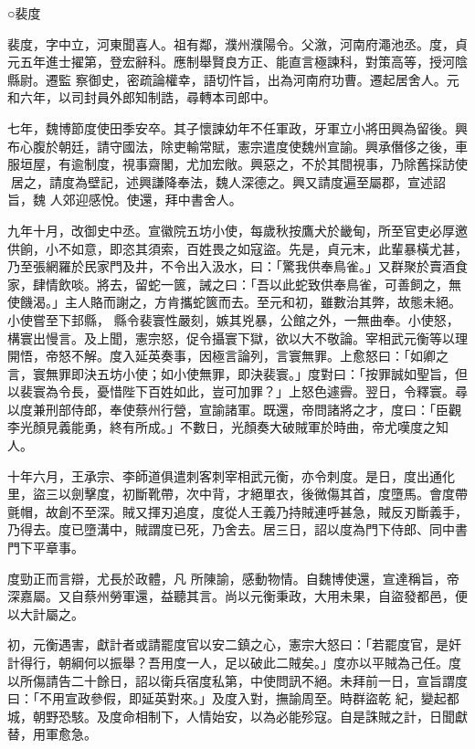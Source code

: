 
\begin{pinyinscope}

 ○裴度



 裴度，字中立，河東聞喜人。祖有鄰，濮州濮陽令。父漵，河南府澠池丞。度，貞元五年進士擢第，登宏辭科。應制舉賢良方正、能直言極諫科，對策高等，授河陰縣尉。遷監
 察御史，密疏論權幸，語切忤旨，出為河南府功曹。遷起居舍人。元和六年，以司封員外郎知制誥，尋轉本司郎中。



 七年，魏博節度使田季安卒。其子懷諫幼年不任軍政，牙軍立小將田興為留後。興布心腹於朝廷，請守國法，除吏輸常賦，憲宗遣度使魏州宣諭。興承僭侈之後，車服垣屋，有逾制度，視事齋閣，尤加宏敞。興惡之，不於其間視事，乃除舊採訪使居之，請度為壁記，述興謙降奉法，魏人深德之。興又請度遍至屬郡，宣述詔旨，魏
 人郊迎感悅。使還，拜中書舍人。



 九年十月，改御史中丞。宣徽院五坊小使，每歲秋按鷹犬於畿甸，所至官吏必厚邀供餉，小不如意，即恣其須索，百姓畏之如寇盜。先是，貞元末，此輩暴橫尤甚，乃至張網羅於民家門及井，不令出入汲水，曰：「驚我供奉鳥雀。」又群聚於賣酒食家，肆情飲啖。將去，留蛇一篋，誡之曰：「吾以此蛇致供奉鳥雀，可善飼之，無使饑渴。」主人賂而謝之，方肯攜蛇篋而去。至元和初，雖數治其弊，故態未絕。小使嘗至下邽縣，
 縣令裴寰性嚴刻，嫉其兇暴，公館之外，一無曲奉。小使怒，構寰出慢言。及上聞，憲宗怒，促令攝寰下獄，欲以大不敬論。宰相武元衡等以理開悟，帝怒不解。度入延英奏事，因極言論列，言寰無罪。上愈怒曰：「如卿之言，寰無罪即決五坊小使；如小使無罪，即決裴寰。」度對曰：「按罪誠如聖旨，但以裴寰為令長，憂惜陛下百姓如此，豈可加罪？」上怒色遽霽。翌日，令釋寰。尋以度兼刑部侍郎，奉使蔡州行營，宣諭諸軍。既還，帝問諸將之才，度曰：「臣觀
 李光顏見義能勇，終有所成。」不數日，光顏奏大破賊軍於時曲，帝尤嘆度之知人。



 十年六月，王承宗、李師道俱遣刺客刺宰相武元衡，亦令刺度。是日，度出通化里，盜三以劍擊度，初斷靴帶，次中背，才絕單衣，後微傷其首，度墮馬。會度帶氈帽，故創不至深。賊又揮刃追度，度從人王義乃持賊連呼甚急，賊反刃斷義手，乃得去。度已墮溝中，賊謂度已死，乃舍去。居三日，詔以度為門下侍郎、同中書門下平章事。



 度勁正而言辯，尤長於政體，凡
 所陳諭，感動物情。自魏博使還，宣達稱旨，帝深嘉屬。又自蔡州勞軍還，益聽其言。尚以元衡秉政，大用未果，自盜發都邑，便以大計屬之。



 初，元衡遇害，獻計者或請罷度官以安二鎮之心，憲宗大怒曰：「若罷度官，是奸計得行，朝綱何以振舉？吾用度一人，足以破此二賊矣。」度亦以平賊為己任。度以所傷請告二十餘日，詔以衛兵宿度私第，中使問訊不絕。未拜前一日，宣旨謂度曰：「不用宣政參假，即延英對來。」及度入對，撫諭周至。時群盜乾
 紀，變起都城，朝野恐駭。及度命相制下，人情始安，以為必能殄寇。自是誅賊之計，日聞獻替，用軍愈急。




\end{pinyinscope}
